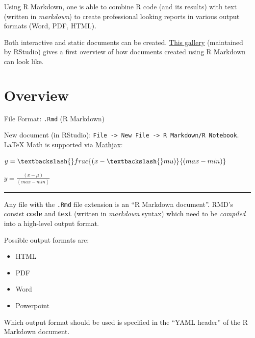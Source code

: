 \documentclass[]{book}
\newenvironment{Shaded}{}{}
\newcommand{\NormalTok}[1]{#1}
\newcommand{\OperatorTok}[1]{#1}
\newcommand{\StringTok}[1]{\textcolor[rgb]{0.00,0.50,0.50}{#1}}
\begin{document}
Using R Markdown, one is able to combine R code (and its results) with text (written in \emph{markdown}) to create professional looking reports in various output formats (Word, PDF, HTML).

Both interactive and static documents can be created.
\href{https://rmarkdown.rstudio.com/gallery.html}{This gallery} (maintained by RStudio) gives a first overview of how documents created using R Markdown can look like.

\hypertarget{overview}{%
\section{Overview}\label{overview}}

File Format: \texttt{.Rmd} (R Markdown)

New document (in RStudio): \texttt{File\ -\textgreater{}\ New\ File\ -\textgreater{}\ R\ Markdown/R\ Notebook}.
LaTeX Math is supported via \href{https://www.mathjax.org/}{Mathjax}:

\begin{Shaded}
\begin{Highlighting}[]
\OperatorTok{$}\NormalTok{y=\textbackslash{}frac\{(x }\OperatorTok{-}\StringTok{ }\NormalTok{\textbackslash{}mu)\}\{(max }\OperatorTok{-}\StringTok{ }\NormalTok{min)\}}\OperatorTok{$}
\end{Highlighting}
\end{Shaded}

\(y=\frac{(x - \mu)}{(max - min)}\)

\begin{center}\rule{0.5\linewidth}{\linethickness}\end{center}

Any file with the \texttt{.Rmd} file extension is an ``R Markdown document''.
RMD's consist \textbf{code} and \textbf{text} (written in \emph{markdown} syntax) which need to be \emph{compiled} into a high-level output format.

Possible output formats are:

\begin{itemize}
\item
  HTML
\item
  PDF
\item
  Word
\item
  Powerpoint
\end{itemize}

Which output format should be used is specified in the ``YAML header'' of the R Markdown document.
\end{document}
